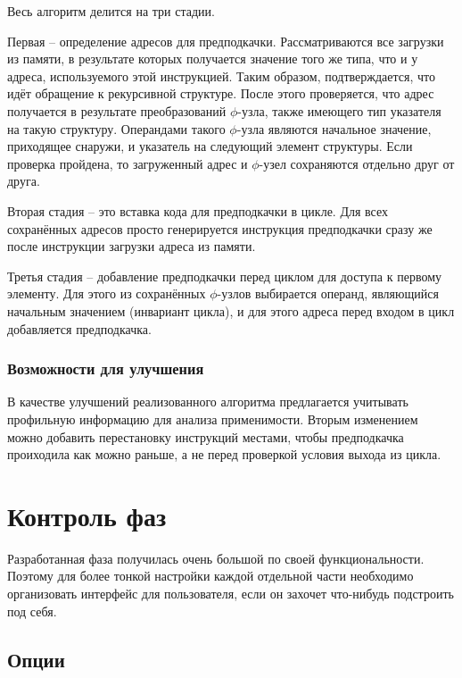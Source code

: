 \documentclass[12pt,a4paper]{article}
\begin{document}
\indent

Весь алгоритм делится на три стадии.

Первая -- определение адресов для предподкачки. Рассматриваются все загрузки из памяти, в результате которых получается значение того же типа, что и у адреса, используемого этой инструкцией. Таким образом, подтверждается, что идёт обращение к рекурсивной структуре. После этого проверяется, что адрес получается в результате преобразований $\phi$-узла, также имеющего тип указателя на такую структуру. Операндами такого $\phi$-узла являются начальное значение, приходящее снаружи, и указатель на следующий элемент структуры. Если проверка пройдена, то загруженный адрес и $\phi$-узел сохраняются отдельно друг от друга.

Вторая стадия -- это вставка кода для предподкачки в цикле. Для всех сохранённых адресов просто генерируется инструкция предподкачки сразу же после инструкции загрузки адреса из памяти.

Третья стадия -- добавление предподкачки перед циклом для доступа к первому элементу. Для этого из сохранённых $\phi$-узлов выбирается операнд, являющийся начальным значением (инвариант цикла), и для этого адреса перед входом в цикл добавляется предподкачка.

\subsubsection{Возможности для улучшения}

\indent

В качестве улучшений реализованного алгоритма предлагается учитывать профильную информацию для анализа применимости. Вторым изменением можно добавить перестановку инструкций местами, чтобы предподкачка проиходила как можно раньше, а не перед проверкой условия выхода из цикла.

\section{Контроль фаз}

\indent

Разработанная фаза получилась очень большой по своей функциональности. Поэтому для более тонкой настройки каждой отдельной части необходимо организовать интерфейс для пользователя, если он захочет что-нибудь подстроить под себя.

\subsection{Опции}
\end{document}
